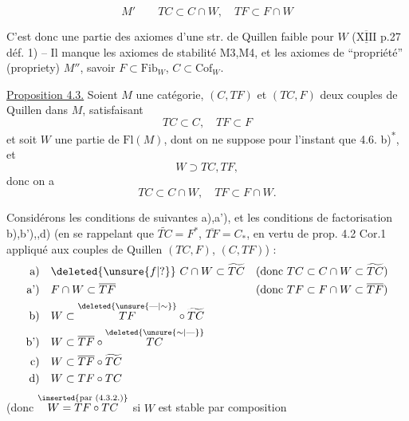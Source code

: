 \[
M'\qquad TC\subset C\cap W,\quad TF\subset F\cap W
\]

C'est donc une partie des axiomes d'une str. de Quillen faible  pour $W$ ($\overline{\underline{\mathrm{XIII}}}$ p.27 déf. 1) -- Il manque les axiomes de stabilité M3,M4, et les axiomes de ``propriété'' (propriety) $M''$, savoir $F\subset\mathrm{Fib}_W$, $C\subset\mathrm{Cof}_W$.

\uline{Proposition 4.3.} Soient $M$ une catégorie, $(C,TF)$ et $(TC,F)$ deux couples de Quillen dans $M$, satisfaisant
\[
TC\subset C,\quad TF\subset F
\tag*{(4.3.1.)}
\]
et soit $W$ une partie de $\mathrm{Fl}(M)$, dont on ne suppose pour l'instant que 4.6. b)\textsuperscript{*}, et
\[
W\supset TC,TF,
\tag*{(4.3.2)}
\]
donc  on a
\[
TC\subset C\cap W,\quad TF\subset F\cap W.
\tag*{(4.3.3)}
\]

Considérons les conditions de   suivantes a),a'), et les conditions de factorisation b),b'),,d) (en se rappelant que $\widetilde{TC}=F^*$, $\overline{TF}=C_*$, en vertu de prop. 4.2 Cor.1 appliqué aux couples de Quillen $(TC,F)$, $(C,TF)$) :
\[
\begin{aligned}
\text{a)}\quad&\deleted{\unsure{f|?}}\ C\cap W\subset\widetilde{TC}
&&\text{(donc }TC\subset C\cap W\subset\widetilde{TC}\text{)}\\
\text{a')}\quad&F\cap W\subset\overline{TF}
&&\text{(donc }TF\subset F\cap W\subset\overline{TF}\text{)}\\
\text{b)}\quad&W\subset\overset{\deleted{\unsure{\text{---}|\sim}}}{TF}\circ\widetilde{TC}\\
\text{b')}\quad&W\subset\overline{TF}\circ\overset{\deleted{\unsure{\sim|\text{---}}}}{TC}\\
\text{c)}\quad&W\subset\overline{TF}\circ\widetilde{TC}\\
\text{d)}\quad&W\subset TF\circ TC
\end{aligned}
\]
(donc $\overset{\inserted{\text{par }(4.3.2.)}}{W=TF\circ TC}$ si $W$ est stable par composition

